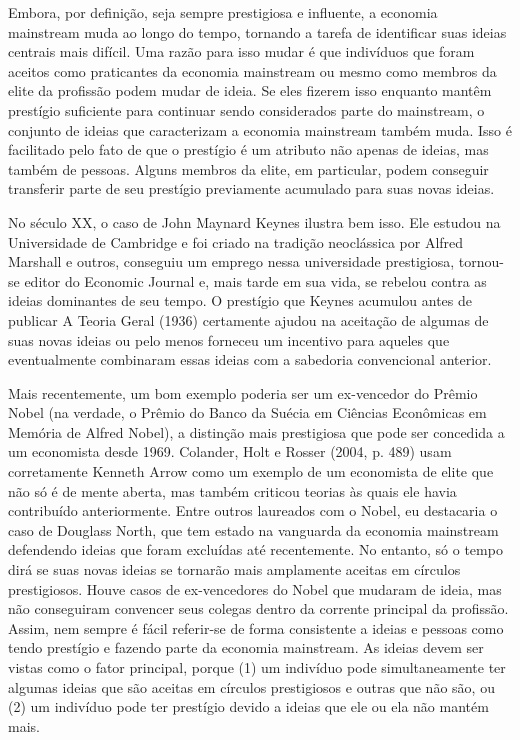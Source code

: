 \documentclass[12pt]{article}
\begin{document}
Embora, por definição, seja sempre prestigiosa e influente, a economia mainstream muda ao longo do tempo, tornando a tarefa de identificar suas ideias centrais mais difícil. Uma razão para isso mudar é que indivíduos que foram aceitos como praticantes da economia mainstream ou mesmo como membros da elite da profissão podem mudar de ideia. Se eles fizerem isso enquanto mantêm prestígio suficiente para continuar sendo considerados parte do mainstream, o conjunto de ideias que caracterizam a economia mainstream também muda. Isso é facilitado pelo fato de que o prestígio é um atributo não apenas de ideias, mas também de pessoas. Alguns membros da elite, em particular, podem conseguir transferir parte de seu prestígio previamente acumulado para suas novas ideias.

No século XX, o caso de John Maynard Keynes ilustra bem isso. Ele estudou na Universidade de Cambridge e foi criado na tradição neoclássica por Alfred Marshall e outros, conseguiu um emprego nessa universidade prestigiosa, tornou-se editor do Economic Journal e, mais tarde em sua vida, se rebelou contra as ideias dominantes de seu tempo. O prestígio que Keynes acumulou antes de publicar A Teoria Geral (1936) certamente ajudou na aceitação de algumas de suas novas ideias ou pelo menos forneceu um incentivo para aqueles que eventualmente combinaram essas ideias com a sabedoria convencional anterior.

Mais recentemente, um bom exemplo poderia ser um ex-vencedor do Prêmio Nobel (na verdade, o Prêmio do Banco da Suécia em Ciências Econômicas em Memória de Alfred Nobel), a distinção mais prestigiosa que pode ser concedida a um economista desde 1969. Colander, Holt e Rosser (2004, p. 489) usam corretamente Kenneth Arrow como um exemplo de um economista de elite que não só é de mente aberta, mas também criticou teorias às quais ele havia contribuído anteriormente. Entre outros laureados com o Nobel, eu destacaria o caso de Douglass North, que tem estado na vanguarda da economia mainstream defendendo ideias que foram excluídas até recentemente. No entanto, só o tempo dirá se suas novas ideias se tornarão mais amplamente aceitas em círculos prestigiosos. Houve casos de ex-vencedores do Nobel que mudaram de ideia, mas não conseguiram convencer seus colegas dentro da corrente principal da profissão. Assim, nem sempre é fácil referir-se de forma consistente a ideias e pessoas como tendo prestígio e fazendo parte da economia mainstream. As ideias devem ser vistas como o fator principal, porque (1) um indivíduo pode simultaneamente ter algumas ideias que são aceitas em círculos prestigiosos e outras que não são, ou (2) um indivíduo pode ter prestígio devido a ideias que ele ou ela não mantém mais.
\end{document}
